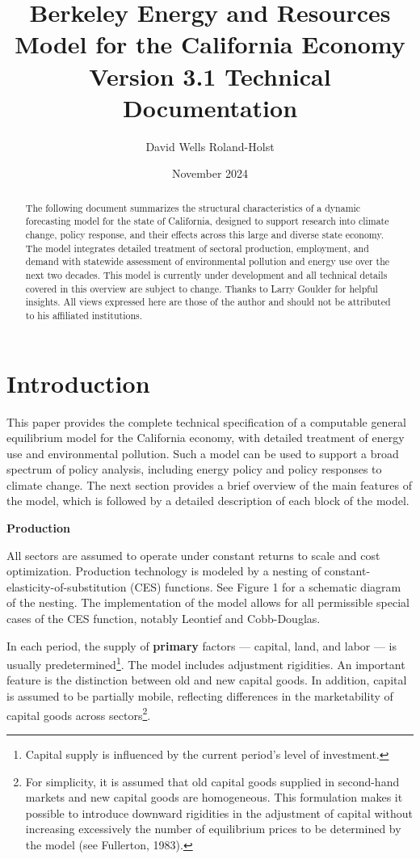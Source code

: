 \documentclass[12pt]{article}
\title{Berkeley Energy and Resources Model for the California Economy Version 3.1 Technical Documentation}
\author{David Wells Roland-Holst}
\date{November 2024}
\begin{document}
\maketitle

\renewcommand{\abstractname}{\underline{\large Abstract}}
\begin{abstract}
The following document summarizes the structural characteristics of a dynamic forecasting model for the state of California, designed to support research into climate change, policy response, and their effects across this large and diverse state economy. The model integrates detailed treatment of sectoral production, employment, and demand with statewide assessment of environmental pollution and energy use over the next two decades. This model is currently under development and all technical details covered in this overview are subject to change. Thanks to Larry Goulder for helpful insights. All views expressed here are those of the author and should not be attributed to his affiliated institutions.
\end{abstract}

\newpage
\tableofcontents

\newpage
\section{Introduction}
This paper provides the complete technical specification of a computable general equilibrium model for the California economy, with detailed treatment of energy use and environmental pollution. Such a model can be used to support a broad spectrum of policy analysis, including energy policy and policy responses to climate change. The next section provides a brief overview of the main features of the model, which is followed by a detailed description of each block of the model.

\textbf{Production}

All sectors are assumed to operate under constant returns to scale and cost optimization. Production technology is modeled by a nesting of constant-elasticity-of-substitution (CES) functions. See Figure 1 for a schematic diagram of the nesting. The implementation of the model allows for all permissible special cases of the CES function, notably Leontief and Cobb-Douglas.

In each period, the supply of \textbf{primary} factors — capital, land, and labor — is usually predetermined\footnote{Capital supply is influenced by the current period’s level of investment.}. The model includes adjustment rigidities. An important feature is the distinction between old and new capital goods. In addition, capital is assumed to be partially mobile, reflecting differences in the marketability of capital goods across sectors\footnote{For simplicity, it is assumed that old capital goods supplied in second-hand markets and new capital goods are homogeneous. This formulation makes it possible to introduce downward rigidities in the adjustment of capital without increasing excessively the number of equilibrium prices to be determined by the model (see Fullerton, 1983).}.
\end{document}
